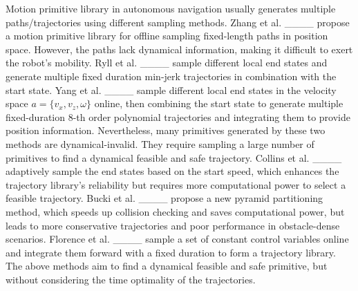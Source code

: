 Motion primitive library in autonomous navigation usually generates multiple paths/trajectories using different sampling methods.
Zhang et al. ____ propose a motion primitive library for offline sampling fixed-length paths in position space. However, the paths lack dynamical information, making it difficult to exert the robot's mobility.
Ryll et al. ____ sample different local end states and generate multiple fixed duration min-jerk trajectories in combination with the start state.
Yang et al. ____ sample different local end states in the velocity space $a=\{v_x, v_z, \omega\}$ online, then combining the start state to generate multiple fixed-duration 8-th order polynomial trajectories and integrating them to provide position information.
Nevertheless, many primitives generated by these two methods are dynamical-invalid. They require sampling a large number of primitives to find a dynamical feasible and safe trajectory.
Collins et al. ____ adaptively sample the end states based on the start speed, which enhances the trajectory library's reliability but requires more computational power to select a feasible trajectory.
Bucki et al. ____ propose a new pyramid partitioning method, which speeds up collision checking and saves computational power, but leads to more conservative trajectories and poor performance in obstacle-dense scenarios.
Florence et al. ____ sample a set of constant control variables online and integrate them forward with a fixed duration to form a trajectory library.
The above methods aim to find a dynamical feasible and safe primitive, but without considering the time optimality of the trajectories.




